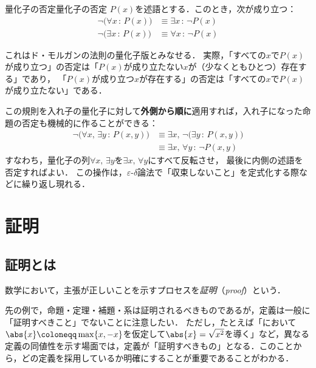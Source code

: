 \begin{prop}{量化子の否定}{量化子の否定}
  $P(x)$を述語とする．このとき，次が成り立つ：
  \begin{align*}
    \lnot \bigl( \forall x \, : \, P(x) \bigr) & \equiv \exists x \, : \, \lnot P(x) \\
    \lnot \bigl( \exists x \, : \, P(x) \bigr) & \equiv \forall x \, : \, \lnot P(x)
  \end{align*}
\end{prop}
 
これはド・モルガンの法則の量化子版とみなせる．
実際，「すべての$x$で$P(x)$が成り立つ」の否定は「$P(x)$が成り立たない$x$が（少なくともひとつ）存在する」であり，
「$P(x)$が成り立つ$x$が存在する」の否定は「すべての$x$で$P(x)$が成り立たない」である．
 
この規則を入れ子の量化子に対して\textbf{外側から順に}適用すれば，入れ子になった命題の否定も機械的に作ることができる：
\begin{align*}
  \lnot \bigl( \forall x,\, \exists y \, : \, P(x, y) \bigr)
  & \equiv \exists x,\, \lnot \bigl( \exists y \, : \, P(x, y) \bigr) \\
  & \equiv \exists x,\, \forall y \, : \, \lnot P(x, y)
\end{align*}
すなわち，量化子の列$\forall x,\, \exists y$を$\exists x,\, \forall y$にすべて反転させ，
最後に内側の述語を否定すればよい．
この操作は，$\varepsilon$-$\delta$論法で「収束しないこと」を定式化する際などに繰り返し現れる．

\section{証明}

\subsection{証明とは}
数学において，主張が正しいことを示すプロセスを\emph{証明}（\emph{proof}）という．

\begin{remark}
  先の例で，命題・定理・補題・系は証明されるべきものであるが，定義は一般に「証明すべきこと」でないことに注意したい．
  ただし，たとえば「において$\abs{x} \coloneqq \max \{ x, -x \}$を仮定して$\abs{x} = \sqrt{x^2}$を導く」など，異なる定義の同値性を示す場面では，定義が「証明すべきもの」となる．このことから，どの定義を採用しているか明確にすることが重要であることがわかる．
\end{remark}

